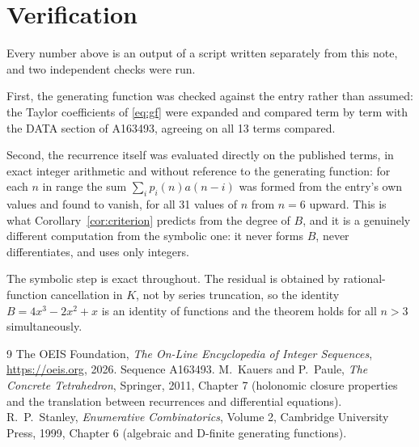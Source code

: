 \documentclass[11pt,a4paper]{article}
\theoremstyle{plain}
\theoremstyle{definition}
\begin{document}
\section{Verification}

Every number above is an output of a script written separately from this note, and two
independent checks were run.

First, the generating function was checked against the entry rather than assumed: the
Taylor coefficients of \eqref{eq:gf} were expanded and compared term by term with the DATA
section of A163493, agreeing on all 13 terms compared.

Second, the recurrence itself was evaluated directly on the published terms, in exact
integer arithmetic and without reference to the generating function: for each $n$ in range
the sum $\sum_{i}p_{i}(n)a(n-i)$ was formed from the entry's own values and found to
vanish, for all 31 values of $n$ from $n=6$ upward. This is what
Corollary~\ref{cor:criterion} predicts from the degree of $B$, and it is a genuinely
different computation from the symbolic one: it never forms $B$, never differentiates, and
uses only integers.

The symbolic step is exact throughout. The residual is obtained by rational-function
cancellation in $K$, not by series truncation, so the identity $B=4 x^{3} - 2 x^{2} + x$ is an
identity of functions and the theorem holds for all $n>3$ simultaneously.

\begin{thebibliography}{9}
 The OEIS Foundation, \emph{The On-Line Encyclopedia of Integer Sequences},
\url{https://oeis.org}, 2026. Sequence A163493.
 M.~Kauers and P.~Paule, \emph{The Concrete Tetrahedron}, Springer, 2011,
Chapter 7 (holonomic closure properties and the translation between recurrences and
differential equations).
 R.~P.~Stanley, \emph{Enumerative Combinatorics}, Volume 2, Cambridge
University Press, 1999, Chapter 6 (algebraic and D-finite generating functions).
\end{thebibliography}
\end{document}
